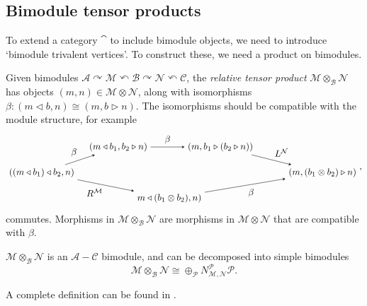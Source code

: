 
\subsection{Bimodule tensor products}\label{sec:bimodtensor}

To extend a category $\cat$ to include bimodule objects, we need to introduce `bimodule trivalent vertices'. To construct these, we need a product on bimodules. 

\begin{definition}
	Given bimodules $\mathcal{A}\curvearrowright\mathcal{M}\curvearrowleft\mathcal{B}\curvearrowright{\mathcal{N}}\curvearrowleft\mathcal{C}$, the \emph{relative tensor product} $\mathcal{M}\otimes_\mathcal{B}\mathcal{N}$ has objects $(m,n)\in \mathcal{M}\otimes\mathcal{N}$, along with isomorphisms $\beta:(m\triangleleft b,n)\cong(m,b\triangleright n)$. The isomorphisms should be compatible with the module structure, for example
	\begin{align}
	\begin{tikzpicture}[scale=.98,baseline=(current bounding box.center)]
	\node (A) at (-1,0) {$((m\triangleleft b_1)\triangleleft b_2,n)$};
	\node (B) at (2,1) {$(m\triangleleft b_1,b_2\triangleright n)$};
	\node (C) at (6,1) {$(m,b_1\triangleright(b_2\triangleright n))$};
	\node (D) at (10,0) {$(m,(b_1\otimes b_2)\triangleright n)$};
	\node (E) at (4,-1) {$m\triangleleft (b_1\otimes b_2), n)$};
	\draw [-stealth,above left] (A)--(B) node [pos=.5] {$\beta$};
	\draw [-stealth,above] (B)--(C) node [pos=.5] {$\beta$};
	\draw [-stealth,above right] (C)--(D) node [pos=.5] {$L^{\mathcal{N}}$};
	\draw [-stealth,below left] (A)--(E) node [pos=.5] {$R^{\mathcal{M}}$};
	\draw [-stealth,below right] (E)--(D) node [pos=.5] {$\beta$};
	\end{tikzpicture},
	\end{align}
	commutes. Morphisms in $\mathcal{M}\otimes_\mathcal{B}\mathcal{N}$ are morphisms in $\mathcal{M}\otimes\mathcal{N}$ that are compatible with $\beta$.
	
	$\mathcal{M}\otimes_\mathcal{B}\mathcal{N}$ is an $\mathcal{A}-\mathcal{C}$ bimodule, and can be decomposed into simple bimodules $$\mathcal{M}\otimes_\mathcal{B}\mathcal{N}\cong\oplus_\mathcal{P}N_{\mathcal{M},\mathcal{N}}^\mathcal{P}\mathcal{P}.$$
	
	A complete definition can be found in \cite{DSPS14}.
\end{definition}


